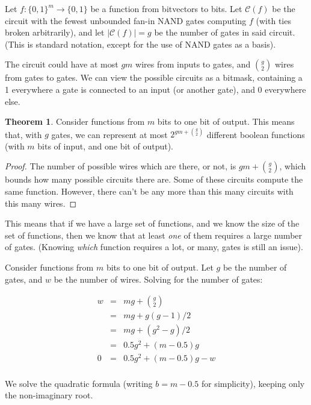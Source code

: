 \documentclass[12pt]{article}
\theoremstyle{definition}
\newtheorem{thm}{Theorem}[section]
\newcommand{\bigC}[0]{\mathcal{C}}
\begin{document}
Let $f: \{0,1\}^m \rightarrow \{0,1\}$ be a function from bitvectors to bits.
Let $\bigC(f)$ be the circuit
with the fewest unbounded fan-in NAND
gates computing $f$ (with ties broken
arbitrarily), and let $|\bigC(f)| = g$ be the number of gates in
said circuit. (This is standard notation, except for the use
of NAND gates as a basis). 

The
circuit could have at most $gm$ wires from inputs to gates, and ${g \choose 2}$
wires from gates to gates. We can view the possible circuits as a bitmask,
containing a 1 everywhere a gate is connected to an input (or another gate),
and 0 everywhere else.

\begin{thm}
\label{boundFromCounting}
Consider functions from $m$ bits to one bit of output.
This means that, with $g$ gates, we can represent at most
$2^{gm + {g \choose 2}}$ different boolean functions (with $m$ bits of input,
and one bit of output).
\end{thm}
\begin{proof}

The number of possible wires which are there, or not, is $gm + {g \choose 2}$,
which bounds how many possible circuits there are.
Some of these circuits compute the same function.
However, there can't be any more than this many circuits with this many wires.
\end{proof}

This means that if we have a large set of functions, and we know the size of
the set of functions, then we know that at least {\em one} of them requires
a large number of gates. (Knowing {\em which} function requires a lot, or many,
gates is still an issue).

Consider functions from $m$ bits to one bit of output.
Let $g$ be the number of gates, and $w$ be the number of wires.
Solving for the number of gates:

\begin{eqnarray*}
w & = & mg + {g \choose 2} \\
  & = & mg + g(g-1)/2 \\
  & = & mg + (g^2 - g) / 2 \\
  & = & 0.5g^2 + (m-0.5)g \\
0 & = & 0.5g^2 + (m-0.5)g - w \\
\end{eqnarray*}

We solve the quadratic formula (writing $b = m-0.5$ for simplicity), keeping
only the non-imaginary root.
\end{document}

